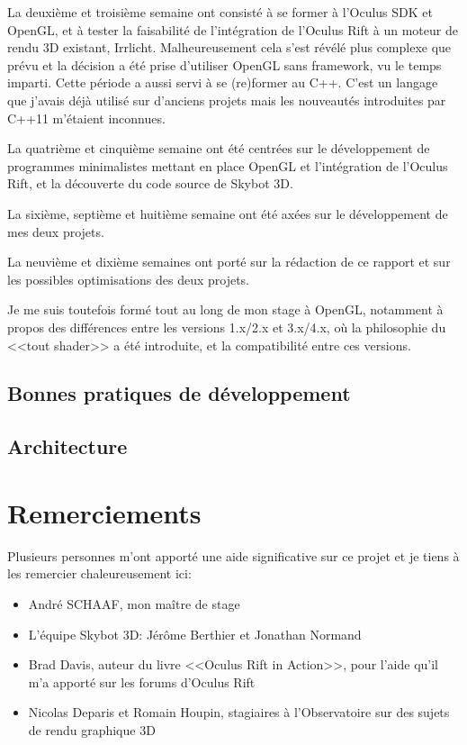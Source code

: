 \documentclass[a4paper,french,12pt]{article}
\begin{document}
		La deuxième et troisième semaine ont consisté à se former à l'Oculus SDK et OpenGL, et à tester la
		faisabilité de l'intégration de l'Oculus Rift à un moteur de rendu 3D existant, Irrlicht. Malheureusement 
		cela s'est révélé plus complexe que prévu et la décision a été prise d'utiliser OpenGL sans framework,
		vu le temps imparti.
		Cette période a aussi servi à se (re)former au C++. C'est un langage que j'avais déjà utilisé sur d'anciens
		projets mais les nouveautés introduites par C++11 m'étaient inconnues.
		
		La quatrième et cinquième semaine ont été centrées sur le développement de programmes minimalistes mettant
		en place OpenGL et l'intégration de l'Oculus Rift, et la découverte du code source de Skybot 3D.
		
		La sixième, septième et huitième semaine ont été axées sur le développement de mes deux projets.
		
		La neuvième et dixième semaines ont porté sur la rédaction de ce rapport et sur les possibles optimisations
		des deux projets.
				
		Je me suis toutefois formé tout au long de mon stage à OpenGL, notamment à propos
		des différences entre les versions 1.x/2.x et 3.x/4.x, où la philosophie du <<tout shader>> a été introduite,
		et la compatibilité entre ces versions.
		
		
	
	\subsection{Bonnes pratiques de développement}
	
	\subsection{Architecture}
	

			
\section{Remerciements}

	Plusieurs personnes m’ont apporté une aide significative sur ce projet et je tiens à les remercier chaleureusement ici: 

	\begin{itemize}
	 \item André SCHAAF, mon maître de stage
	 \item L'équipe Skybot 3D: Jérôme Berthier et Jonathan Normand
	 \item Brad Davis, auteur du livre <<Oculus Rift in Action>>, pour l'aide qu'il m'a apporté sur les forums d'Oculus Rift
	 \item Nicolas Deparis et Romain Houpin, stagiaires à l'Observatoire sur des sujets de rendu graphique 3D
	\end{itemize}
\end{document}
